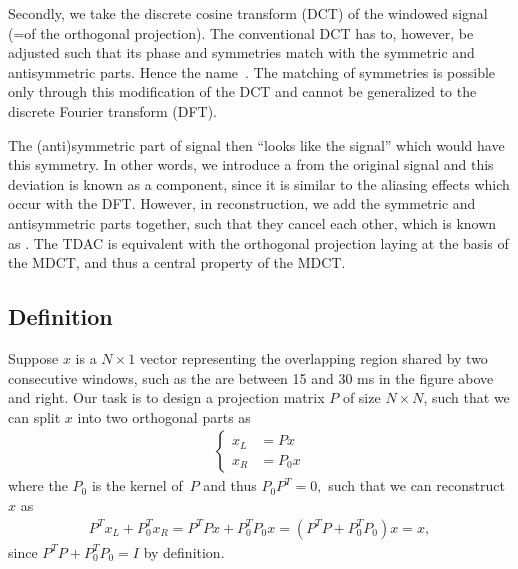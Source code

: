 \documentclass[letterpaper,10pt,english]{jupyterBook}
\begin{document}
\sphinxAtStartPar
Secondly, we take the discrete cosine transform (DCT) of the windowed
signal (=of the orthogonal projection). The conventional DCT has to,
however, be adjusted such that its phase and symmetries match with the
symmetric and anti\sphinxhyphen{}symmetric parts. Hence the name . The matching of symmetries is possible only through this
modification of the DCT and cannot be generalized to the discrete
Fourier transform (DFT).

\sphinxAtStartPar
The (anti)symmetric part of signal then “looks like the signal” which
would have this symmetry. In other words, we introduce a 
from the original signal and this deviation is known as a  component, since it is similar to the aliasing effects which
occur with the DFT. However, in reconstruction, we add the symmetric and
anti\sphinxhyphen{}symmetric parts together, such that they cancel each other, which
is known as . The TDAC is
equivalent with the orthogonal projection laying at the basis of the
MDCT, and thus a central property of the MDCT.


\subsection{Definition}
\label{\detokenize{Transmission/Modified_discrete_cosine_transform_MDCT:definition}}
\sphinxAtStartPar
Suppose \(x\) is a \(N\times1\) vector representing the overlapping region shared
by two consecutive windows, such as the are between 15 and 30 ms in the
figure above and right. Our task is to design a projection matrix \(P\) of
size \(N\times N\), such that we can split \(x\) into two orthogonal parts as
\begin{equation*}
\begin{split} \begin{cases} x_L &= Px\\ x_R &= P_0x \end{cases} \end{split}
\end{equation*}
\sphinxAtStartPar
where the \(P_{0}\) is the kernel of \(P\) and thus \( P_0 P^T = 0,
\) such that we can reconstruct \(x\) as
\begin{equation*}
\begin{split} P^T x_L+P_0^Tx_R = P^T P x + P_0^T P_0 x = (P^T P + P_0^T P_0)x =
x, \end{split}
\end{equation*}
\sphinxAtStartPar
since \( P^T P + P_0^T P_0 = I \) by definition.
\end{document}
